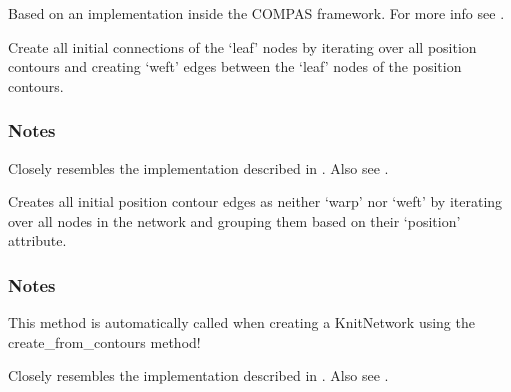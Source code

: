 \documentclass[letterpaper,10pt,english]{sphinxmanual}
\begin{document}
\begin{fulllineitems}
\begin{fulllineitems}
Based on an implementation inside the COMPAS framework.
For more info see \sphinxfootnotemark[16].

\end{fulllineitems}


\begin{fulllineitems}
\label{\detokenize{cockatoo:cockatoo.KnitNetwork.initialize_leaf_connections}}
Create all initial connections of the ‘leaf’ nodes by iterating over
all position contours and creating ‘weft’ edges between the ‘leaf’
nodes of the position contours.
\subsubsection*{Notes}

Closely resembles the implementation described in  \sphinxfootnotemark[1]. Also see
 \sphinxfootnotemark[2].

\end{fulllineitems}


\begin{fulllineitems}
\label{\detokenize{cockatoo:cockatoo.KnitNetwork.initialize_position_contour_edges}}
Creates all initial position contour edges as neither ‘warp’ nor ‘weft’
by iterating over all nodes in the network and grouping them based on
their ‘position’ attribute.
\subsubsection*{Notes}

This method is automatically called when creating a KnitNetwork using
the create\_from\_contours method!

Closely resembles the implementation described in  \sphinxfootnotemark[1]. Also see
 \sphinxfootnotemark[2].


\end{fulllineitems}
\end{fulllineitems}
\end{document}
